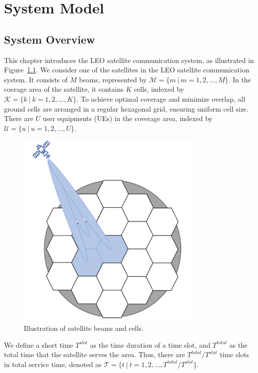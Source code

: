 \chapter{System Model}
\label{chap:model}
\section{System Overview}

This chapter introduces the LEO satellite communication system, as illustrated in Figure~\ref{fig_system}. We consider one of the satellites in the LEO satellite communication system. It consists of $M$ beams, represented by $\mathcal{M} = \{m\ |\ m = 1, 2, \ldots, M\}$. In the coerage area of the satellite, it contains $K$ cells, indexed by $\mathcal{K} = \{k\ |\ k = 1, 2, \ldots, K\}$. To achieve optimal coverage and minimize overlap, all ground cells are arranged in a regular hexagonal grid, ensuring uniform cell size. There are $U$ user equipments (UEs) in the coverage area, indexed by $\mathcal{U} = \{u\ |\ u = 1, 2, \ldots, U\}$. 

\begin{figure}[h!]
    \centering
    \includegraphics[width=0.8\textwidth]{figure/system overview2.pdf}
    \caption{Illustration of satellite beams and cells.}
    \label{fig_system}
\end{figure}
We define a short time $T^{slot}$ as the time duration of a time slot, and $T^{total}$ as the total time that the satellite serves the area. Thus, there are $T^{total} / T^{slot}$ time slots in total service time, denoted as $\mathcal{T} = \{t\ |\ t = 1, 2, \ldots, T^{total} / T^{slot}\}$. 

